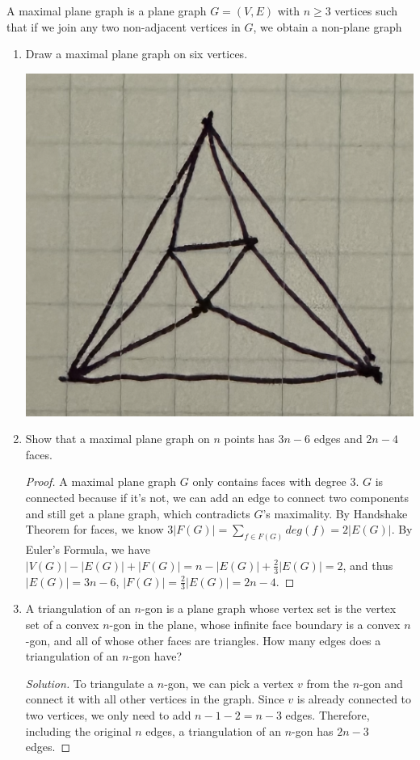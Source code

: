 \documentclass{article}
\newenvironment{problem}[2][Question]{\begin{trivlist}
\item[\hskip \labelsep {\bfseries #1}\hskip \labelsep {\bfseries #2.}]}{\end{trivlist}}
\begin{document}
\newpage

\begin{problem}{4.7.7}
    A maximal plane graph is a plane graph $G = (V, E)$ with $n \geq 3$ vertices such that if we join any two non-adjacent vertices in $G$, we obtain a non-plane graph
\end{problem}

\begin{enumerate}[label=(\alph*)]
    \item Draw a maximal plane graph on six vertices.

    \includegraphics[width=.25\textwidth]{Q477a}

    \item Show that a maximal plane graph on $n$ points has $3n - 6$ edges and $2n - 4$ faces.

    \begin{proof}
        A maximal plane graph $G$ only contains faces with degree $3$. $G$ is connected because if it's not, we can add an edge to connect two components and still get a plane graph, which contradicts $G$'s maximality. By Handshake Theorem for faces, we know $3|F(G)| = \sum\limits_{f \in F(G)} deg(f) = 2|E(G)|$. By Euler's Formula, we have $|V(G)| - |E(G)| + |F(G)| = n - |E(G)| + \frac{2}{3}|E(G)| = 2$, and thus $|E(G)| = 3n - 6$, $|F(G)| = \frac{2}{3}|E(G)| = 2n - 4$.
    \end{proof}
    
    \item A triangulation of an $n$-gon is a plane graph whose vertex set is the vertex set of a convex $n$-gon in the plane, whose infinite face boundary is a convex $n$-gon, and all of whose other faces are triangles. How many edges does a triangulation of an $n$-gon have?
    
    \begin{proof}[Solution]
        To triangulate a $n$-gon, we can pick a vertex $v$ from the $n$-gon and connect it with all other vertices in the graph. Since $v$ is already connected to two vertices, we only need to add $n - 1 - 2 = n - 3$ edges. Therefore, including the original $n$ edges, a triangulation of an $n$-gon has $2n - 3$ edges.
    \end{proof}
\end{enumerate}
\end{document}

